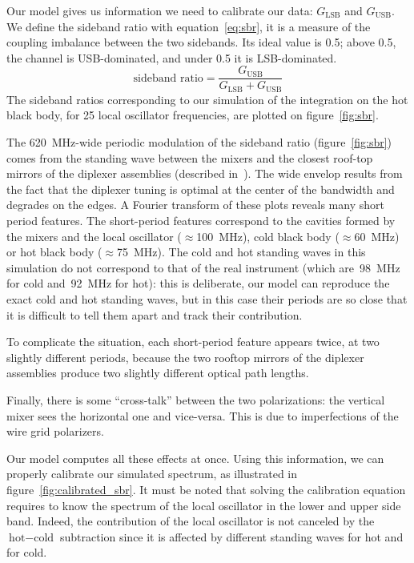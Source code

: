 \documentclass[journal]{IEEEtran}
\begin{document}
Our model gives us information we need to calibrate our data: $G_\text{LSB}$ and $G_\text{USB}$.
We define the sideband ratio with equation~\eqref{eq:sbr}, it is a measure of the coupling imbalance between the two sidebands.
Its ideal value is 0.5; above 0.5, the channel is USB-dominated, and under 0.5 it is LSB-dominated.
\begin{equation}
    \text{sideband ratio}
    =
    \frac{G_\text{USB}}{G_\text{LSB} + G_\text{USB}}
    \label{eq:sbr}
\end{equation}
The sideband ratios corresponding to our simulation of the integration on the hot black body, for 25 local oscillator frequencies, are plotted on figure~\ref{fig:sbr}.

The \SI{620}{\mega\hertz}-wide periodic modulation of the sideband ratio (figure~\ref{fig:sbr}) comes from the standing wave between the mixers and the closest roof-top mirrors of the diplexer assemblies (described in~\cite{jackson2002hifi, martin1982polarizing}).
The wide envelop results from the fact that the diplexer tuning is optimal at the center of the bandwidth and degrades on the edges.
A Fourier transform of these plots reveals many short period features.
The short-period features correspond to the cavities formed by the mixers and
the local oscillator ($\approx$\SI{100}{\mega\hertz}),
cold black body ($\approx$\SI{60}{\mega\hertz}) or
hot black body ($\approx$\SI{75}{\mega\hertz}).
The cold and hot standing waves in this simulation do not correspond to that of the real instrument (which are~\SI{98}{\mega\hertz} for cold and~\SI{92}{\mega\hertz} for hot): this is deliberate, our model can reproduce the exact cold and hot standing waves, but in this case their periods are so close that it is difficult to tell them apart and track their contribution.

To complicate the situation, each short-period feature appears twice, at two slightly different periods, because the two rooftop mirrors of the diplexer assemblies produce two slightly different optical path lengths.

Finally, there is some ``cross-talk'' between the two polarizations: the vertical mixer sees the horizontal one and vice-versa.
This is due to imperfections of the wire grid polarizers.

Our model computes all these effects at once.
Using this information, we can properly calibrate our simulated spectrum, as illustrated in figure~\ref{fig:calibrated_sbr}.
It must be noted that solving the calibration equation requires to know the spectrum of the local oscillator in the lower and upper side band.
Indeed, the contribution of the local oscillator is not canceled by the $\text{hot}-\text{cold}$ subtraction since it is affected by different standing waves for hot and for cold.
\end{document}
